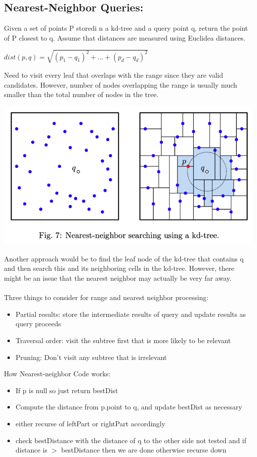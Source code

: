 \documentclass{article}
\begin{document}
  \subsection{Nearest-Neighbor Queries: }
  Given a set of points P storedi n a kd-tree and a query point q, return the point of P closest to q. Assume that distances are measured using Euclidea distances.
  \begin{center}
    $dist(p,q) = \sqrt{(p_{1}-q_{1})^{2} + ... + (p_{d}-q_{d})^{2}}$
  \end{center}
  Need to visit every leaf that overlaps with the range since they are valid candidates. However, number of nodes overlapping the range is usually much smaller than the total number of nodes in the tree. \\
  \begin{center}
  \includegraphics[scale=0.4]{NearestNeighborExample}
  \end{center}
  Another approach would be to find the leaf node of the kd-tree that contains q and then search this and its neighboring cells in the kd-tree. However, there might be an issue that the nearest neighbor may actually be very far away. \\ \\
  Three things to consider for range and nearest neighbor processing:
  \begin{itemize}[noitemsep]
    \item Partial results: store the intermediate results of query and update results as query proceeds
    \item Traversal order: visit the subtree first that is more likely to be relevant
    \item Pruning: Don't visit any subtree that is irrelevant
  \end{itemize}
  How Nearest-neighbor Code works:
  \begin{itemize}[noitemsep]
    \item If p is null so just return bestDist
    \item Compute the distance from p.point to q, and update bestDist as necessary
    \item either recurse of leftPart or rightPart accordingly
    \item check bestDistance with the distance of q to the other side not tested and if distance is $>$ bestDistance then we are done otherwise recurse down
  \end{itemize}
\end{document}
